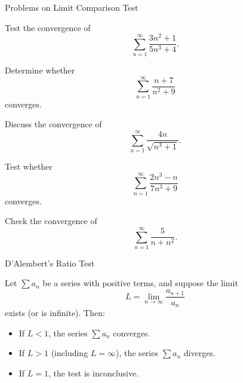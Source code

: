 \documentclass[12pt, a4paper]{article}
\begin{document}
\clearpage

\begin{heading}
    Problems on Limit Comparison Test
\end{heading}

\begin{problem}
Test the convergence of 
\[
\sum_{n=1}^{\infty} \frac{3n^2 + 1}{5n^3 + 4}.
\]
\end{problem}

\clearpage

\begin{problem}
Determine whether 
\[
\sum_{n=1}^{\infty} \frac{n+7}{n^2 + 9}
\]
converges.
\end{problem}

\clearpage

\begin{problem}
Discuss the convergence of 
\[
\sum_{n=1}^{\infty} \frac{4n}{\sqrt{n^3 + 1}}.
\]
\end{problem}

\clearpage

\begin{problem}
Test whether
\[
\sum_{n=1}^{\infty} \frac{2n^3 - n}{7n^3 + 9}
\]
converges.
\end{problem}

\clearpage

\begin{problem}
Check the convergence of 
\[
\sum_{n=1}^{\infty} \frac{5}{n + n^2}.
\]
\end{problem}

\clearpage


\begin{heading}
	 D'Alembert’s Ratio Test
\end{heading}

\vspace{10pt}

\begin{theorem}
	Let $\sum a_n$ be a series with positive terms, and suppose the limit
	\[
	L = \lim_{n \to \infty} \frac{a_{n+1}}{a_n}
	\]
	exists (or is infinite). Then:

	\begin{itemize}
		\item[(i)] If \(L < 1\), the series \(\sum a_n\) converges.
		\item[(ii)] If \(L > 1\) (including \(L = \infty\)), the series \(\sum a_n\) diverges.
		\item[(iii)] If \(L = 1\), the test is inconclusive.
	\end{itemize}
\end{theorem}
\end{document}
